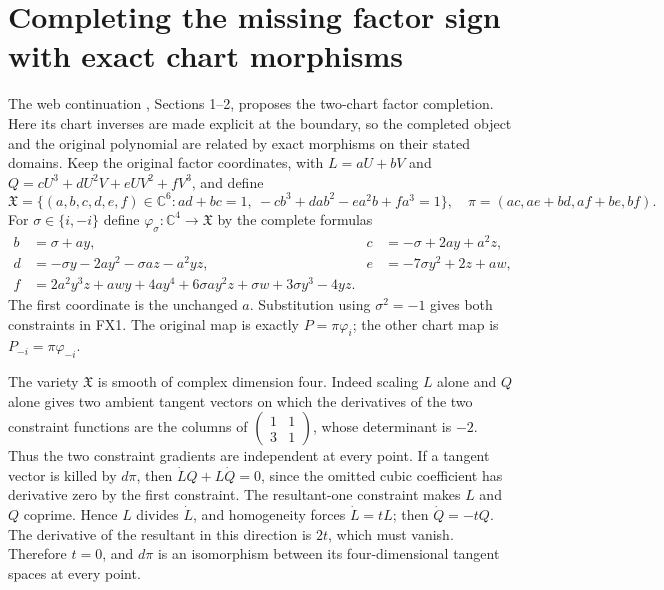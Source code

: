 \documentclass[11pt]{article}
\newcommand{\C}{\mathbb C}
\begin{document}
\section{Completing the missing factor sign with exact chart morphisms}
The web continuation \cite{WebFable}, Sections 1--2, proposes the
two-chart factor completion. Here its chart inverses are made explicit
at the boundary, so the completed object and the original polynomial
are related by exact morphisms on their stated domains.
Keep the original factor coordinates, with
$L=aU+bV$ and $Q=cU^3+dU^2V+eUV^2+fV^3$, and define
\[
 \mathfrak X=\{(a,b,c,d,e,f)\in\C^6:
 ad+bc=1,\ -cb^3+dab^2-ea^2b+fa^3=1\},
 \quad\pi=(ac,ae+bd,af+be,bf). \tag{FX1}
\]
For $\sigma\in\{i,-i\}$ define $\varphi_\sigma:\C^4\to\mathfrak X$
by the complete formulas
\[
 \begin{aligned}
 b&=\sigma+ay,&c&=-\sigma+2ay+a^2z,\\
 d&=-\sigma y-2ay^2-\sigma az-a^2yz,&
 e&=-7\sigma y^2+2z+aw,\\
 f&=2a^2y^3z+awy+4ay^4+6\sigma ay^2z+\sigma w
                                      +3\sigma y^3-4yz.
 \end{aligned} \tag{FX2}
\]
The first coordinate is the unchanged $a$.
Substitution using $\sigma^2=-1$ gives both constraints in FX1.
The original map is exactly $P=\pi\varphi_i$; the other chart
map is $P_{-i}=\pi\varphi_{-i}$.

The variety $\mathfrak X$ is smooth of complex dimension four.
Indeed scaling $L$ alone and $Q$ alone gives two ambient tangent
vectors on which the derivatives of the two constraint functions
are the columns of
$\left(\begin{smallmatrix}1&1\\3&1\end{smallmatrix}\right)$,
whose determinant is $-2$. Thus the two constraint gradients are
independent at every point. If a tangent vector is killed by
$d\pi$, then $\dot LQ+L\dot Q=0$, since the omitted cubic
coefficient has derivative zero by the first constraint. The
resultant-one constraint makes $L$ and $Q$ coprime. Hence $L$
divides $\dot L$, and homogeneity forces $\dot L=tL$;
then $\dot Q=-tQ$. The derivative of the resultant in this
direction is $2t$, which must vanish. Therefore $t=0$, and
$d\pi$ is an isomorphism between its four-dimensional tangent
spaces at every point.
\end{document}
